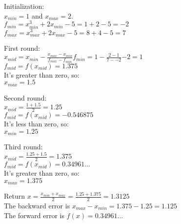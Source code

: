 \documentclass[11pt,letterpaper]{article}
\begin{document}
Initialization:\\
$x_{min} = 1$ and $x_{max} = 2$.\\
$f_{min} = x_{min}^{3} + 2x_{min} - 5 = 1 + 2 - 5 = -2$\\
$f_{max} = x_{max}^{3} + 2x_{max} - 5 = 8 + 4 - 5 = 7$\\

\newcommand{\xmid}[4]{{#1} - \frac{{#2} - {#1}}{{#4} - {#3}}{#3}}

First round:\\
$x_{mid} = \xmid{x_{min}}{x_{max}}{f_{min}}{f_{max}} = \xmid{1}{2}{{-2}}{7} = 1$\\
$f_{mid} = f(x_{mid}) = 1.375 $\\
It's greater than zero, so:\\
$x_{max} = 1.5$

Second round:\\
$x_{mid} = \frac{1+1.5}{2} = 1.25$\\
$f_{mid} = f(x_{mid}) = -0.546875 $\\
It's less than zero, so:\\
$x_{min} = 1.25$

Third round:\\
$x_{mid} = \frac{1.25+1.5}{2} = 1.375$\\
$f_{mid} = f(x_{mid}) = 0.34961... $\\
It's greater than zero, so:\\
$x_{max} = 1.375$

Return $x = \frac{x_{min} + x_{max}}{2} = \frac{1.25 + 1.375}{2} = 1.3125$\\
The backward error is $x_{max} - x_{min} = 1.375 - 1.25 = 1.125$\\
The forward error is $f(x) = 0.34961...$
\end{document}
